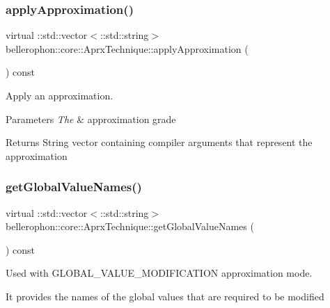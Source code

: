 \subsubsection{\texorpdfstring{apply\+Approximation()}{applyApproximation()}}
{\footnotesize\ttfamily virtual \+::std\+::vector$<$\+::std\+::string$>$ bellerophon\+::core\+::\+Aprx\+Technique\+::apply\+Approximation (\begin{DoxyParamCaption}\item[{\+::bellerophon\+::core\+::\+Aprx\+Grade}]{ }\end{DoxyParamCaption}) const\hspace{0.3cm}{\ttfamily [inline]}}



Apply an approximation. 


\begin{DoxyParams}{Parameters}
{\em The} & approximation grade \\
\hline
\end{DoxyParams}
\begin{DoxyReturn}{Returns}
String vector containing compiler arguments that represent the approximation 
\end{DoxyReturn}
\hypertarget{classbellerophon_1_1core_1_1AprxTechnique_a5d78bfe611a2e1884fd66f06ccde84d7}{}\label{classbellerophon_1_1core_1_1AprxTechnique_a5d78bfe611a2e1884fd66f06ccde84d7} 
\subsubsection{\texorpdfstring{get\+Global\+Value\+Names()}{getGlobalValueNames()}}
{\footnotesize\ttfamily virtual \+::std\+::vector$<$\+::std\+::string$>$ bellerophon\+::core\+::\+Aprx\+Technique\+::get\+Global\+Value\+Names (\begin{DoxyParamCaption}{ }\end{DoxyParamCaption}) const\hspace{0.3cm}{\ttfamily [inline]}}



Used with G\+L\+O\+B\+A\+L\+\_\+\+V\+A\+L\+U\+E\+\_\+\+M\+O\+D\+I\+F\+I\+C\+A\+T\+I\+ON approximation mode. 

It provides the names of the global values that are required to be modified \hypertarget{classbellerophon_1_1core_1_1AprxTechnique_a6bcebd487e19b535ee4097d21f7df5db}{}\label{classbellerophon_1_1core_1_1AprxTechnique_a6bcebd487e19b535ee4097d21f7df5db} 
